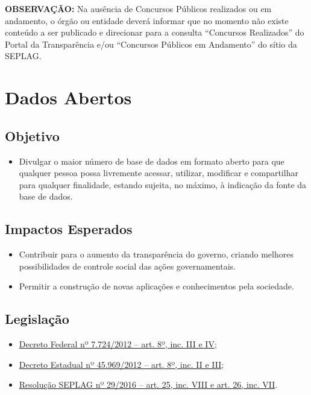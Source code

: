 \documentclass[
]{book}
\providecommand{\tightlist}{%
  \setlength{\itemsep}{0pt}\setlength{\parskip}{0pt}}
\begin{document}
\textbf{OBSERVAÇÃO:} Na ausência de Concursos Públicos realizados ou em andamento, o órgão ou entidade deverá informar que no momento não existe conteúdo a ser publicado e direcionar para a consulta ``Concursos Realizados'' do Portal da Transparência e/ou ``Concursos Públicos em Andamento'' do sítio da SEPLAG.

\hypertarget{dados-abertos}{%
\section{Dados Abertos}\label{dados-abertos}}

\hypertarget{objetivo-9}{%
\subsection{Objetivo}\label{objetivo-9}}

\begin{itemize}
\tightlist
\item
  Divulgar o maior número de base de dados em formato aberto para que qualquer pessoa possa livremente acessar, utilizar, modificar e compartilhar para qualquer finalidade, estando sujeita, no máximo, à indicação da fonte da base de dados.
\end{itemize}

\hypertarget{impactos-esperados-10}{%
\subsection{Impactos Esperados}\label{impactos-esperados-10}}

\begin{itemize}
\tightlist
\item
  Contribuir para o aumento da transparência do governo, criando melhores possibilidades de controle social das ações
  governamentais.
\item
  Permitir a construção de novas aplicações e conhecimentos pela sociedade.
\end{itemize}

\hypertarget{legislauxe7uxe3o-10}{%
\subsection{Legislação}\label{legislauxe7uxe3o-10}}

\begin{itemize}
\tightlist
\item
  \href{http://www.planalto.gov.br/ccivil_03/_ato2011-2014/2012/decreto/d7724.htm\#art8}{Decreto Federal nº 7.724/2012 -- art. 8º, inc. III e IV};
\item
  \href{https://www.almg.gov.br/consulte/legislacao/completa/completa.html?tipo=DEC\&num=45969\&ano=2012}{Decreto Estadual nº 45.969/2012 -- art. 8º, inc. II e III};
\item
  \href{http://www.planejamento.mg.gov.br/sites/default/files/documentos/resolucao_sitios_seplag_29_de_05_07_2016_1.pdf}{Resolução SEPLAG nº 29/2016 -- art. 25, inc. VIII e art. 26, inc. VII}.
\end{itemize}
\end{document}
